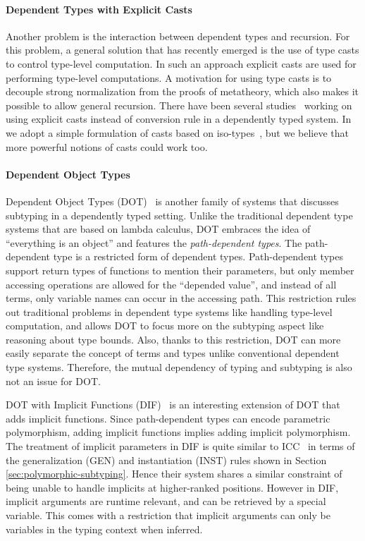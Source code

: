 \paragraph{Dependent Types with Explicit Casts} Another problem is the
interaction between dependent types and recursion. For this
problem, a general solution that has recently emerged is the use
of type casts to control type-level computation. In such an approach explicit casts
are used for performing type-level computations. A motivation for
using type casts is to decouple strong normalization from the
proofs of metatheory, which also makes it possible to allow general
recursion. There have been several studies~\citep{guru,sjoberg:msfp12,
  kimmel:plpv, zombie:popl15, fc:kind, Doorn:2013hq,isotype} working
on using explicit casts instead of conversion rule in a dependently
typed system. In \name we adopt a simple formulation of casts based
on iso-types~\citep{isotype}, but we believe that more powerful notions
of casts could work too.

\paragraph{Dependent Object Types}

Dependent Object Types (DOT)~\citep{dot:dot,dot:path,dot:sound} is another
family of systems that discusses subtyping in a dependently typed setting.
Unlike the traditional dependent type systems that are based on lambda calculus, DOT
embraces the idea of ``everything is an object'' and features the \emph{path-dependent types}.
The path-dependent type is a restricted form of dependent types.
Path-dependent types support return types of functions to mention their parameters, but only
member accessing operations are allowed for the ``depended value'',
and instead of all terms, only variable names can occur in the accessing path.
This restriction rules out traditional problems in dependent type systems
like handling type-level computation, and allows DOT to focus more on the subtyping
aspect like reasoning about type bounds. Also, thanks to this restriction, DOT
can more easily separate the concept of terms and types unlike conventional dependent type systems.
Therefore, the mutual dependency of typing and subtyping is also not an issue for DOT.

DOT with Implicit Functions (DIF)~\citep{dif} is an interesting extension of DOT
that adds implicit functions.
Since path-dependent types can encode parametric
polymorphism, adding implicit functions implies adding implicit polymorphism.
The treatment of implicit parameters in DIF is quite similar
to ICC~\citep{miquel2001implicit} in terms of the generalization (GEN) and
instantiation (INST) rules shown in Section \ref{sec:polymorphic-subtyping}.
Hence their system shares a similar constraint of being unable to handle implicits
at higher-ranked positions. However in DIF, implicit arguments are runtime relevant,
and can be retrieved by a special variable. This comes with a restriction that
implicit arguments can only be variables in the typing context when inferred.

